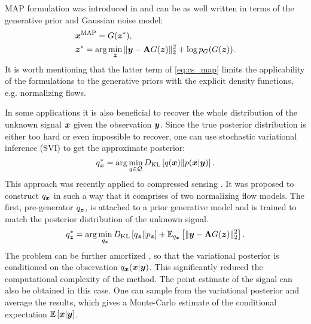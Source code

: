 MAP formulation was introduced in \cite{Whang2021-fj} and can be as well written in terms of the generative prior and Gaussian noise model:
\begin{align}
    &\vx^{\text{MAP}} = G(\vz^*),\\
    &\vz^* = \arg \min_\vz \|\vy - \mathbf{A} G(\vz)\|_2^2 + \log p_{G}(G(\vz)). \label{eq:cs_map}
\end{align}
It is worth mentioning that the latter term of \eqref{eq:cs_map} limits the applicability of the formulations to the generative priors with the explicit density functions, e.g. normalizing flows.  

In some applications it is also beneficial to recover the whole distribution of the unknown signal ${\bm{x}}$ given the observation ${\bm{y}}$. Since the true posterior distribution is either too hard or even impossible to recover, one can use stochastic variational inference (SVI) to get the approximate posterior:
\begin{equation}
    q_{\bm{x}}^* = \arg\min_{q \in \mathcal{Q}} D_{\mathrm{KL}}\left[q({\bm{x}})\|p({\bm{x}}|{\bm{y}})\right].
\end{equation}
This approach was recently applied to compressed sensing \cite{Whang2021-if}. It was proposed to construct $q_{\bm{x}}$ in such a way that it comprises of two normalizing flow models. The first, pre-generator $q_{\bm{z}}$, is attached to a prior generative model and is trained to match the posterior distribution of the unknown signal. 
\begin{equation}
    q_{\bm{z}}^* = \arg\min_{q_{\bm{z}}} D_{\mathrm{KL}}\left[ q_{\bm{z}}\|p_{\bm{z}}\right] + 
    \mathbb{E}_{q_{\bm{z}}}\left[\|{\bm{y}} - \mathbf{A}G({\bm{z}})\|_2^2 \right].
\end{equation}
The problem can be further amortized \citep{kingma2014autoencoding, rezende2014stochastic}, so that the variational posterior is conditioned on the observation $q_{{\bm{x}}}({\bm{x}}|{\bm{y}})$. This significantly reduced the computational complexity of the method. The point estimate of the signal can also be obtained in this case. One can sample from the variational posterior and average the results, which gives a Monte-Carlo estimate of the conditional expectation $\mathbb{E}\left[{\bm{x}}|{\bm{y}}\right]$.

